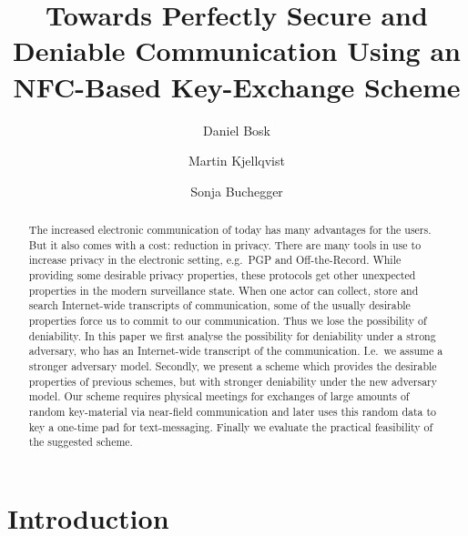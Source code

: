 \title{%
  Towards Perfectly Secure and Deniable Communication Using an NFC-Based 
  Key-Exchange Scheme
}
\author{%
  Daniel Bosk
  \and
  Martin Kjellqvist
  \and
  Sonja Buchegger
}

\maketitle
\begin{abstract}
  The increased electronic communication of today has many advantages for the 
  users.
  But it also comes with a cost: reduction in privacy.
  There are many tools in use to increase privacy in the electronic setting, 
  e.g.~PGP and Off-the-Record.
  While providing some desirable privacy properties, these protocols get other 
  unexpected properties in the modern surveillance state.
  When one actor can collect, store and search Internet-wide transcripts of 
  communication, some of the usually desirable properties force us to commit to 
  our communication.
  Thus we lose the possibility of deniability.
  In this paper we first analyse the possibility for deniability under a strong 
  adversary, who has an Internet-wide transcript of the communication.
  I.e.~we assume a stronger adversary model.
  Secondly, we present a scheme which provides the desirable properties of 
  previous schemes, but with stronger deniability under the new adversary 
  model.
  Our scheme requires physical meetings for exchanges of large amounts of 
  random key-material via near-field communication and later uses this random 
  data to key a one-time pad for text-messaging.
  Finally we evaluate the practical feasibility of the suggested scheme.

\end{abstract}

\acresetall{}
\section{Introduction}

